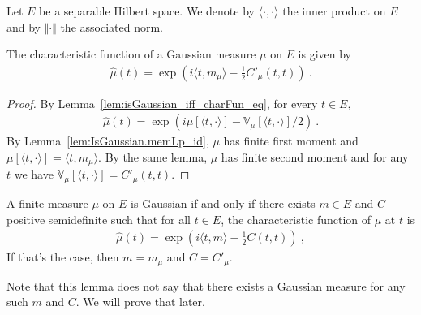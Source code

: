 Let $E$ be a separable Hilbert space. We denote by $\langle \cdot, \cdot \rangle$ the inner product on $E$ and by $\Vert \cdot \Vert$ the associated norm.

\begin{lemma}\label{lem:IsGaussian.charFun_eq}
The characteristic function of a Gaussian measure $\mu$ on $E$ is given by
\begin{align*}
  \hat{\mu}(t) = \exp\left(i \langle t, m_\mu \rangle - \frac{1}{2} C'_\mu(t, t)\right) \: .
\end{align*}
\end{lemma}

\begin{proof}  
By Lemma~\ref{lem:isGaussian_iff_charFun_eq}, for every $t \in E$,
\begin{align*}
  \hat{\mu}(t) = \exp\left(i \mu[\langle t, \cdot \rangle] - \mathbb{V}_\mu[\langle t, \cdot \rangle] / 2\right) \: .
\end{align*}
By Lemma~\ref{lem:IsGaussian.memLp_id}, $\mu$ has finite first moment and $\mu[\langle t, \cdot \rangle] = \langle t, m_\mu \rangle$. By the same lemma, $\mu$ has finite second moment and for any $t$ we have $\mathbb{V}_\mu[\langle t, \cdot\rangle] = C'_\mu(t, t)$.
\end{proof}

\begin{lemma}\label{lem:isGaussian_iff_gaussian_charFun}
A finite measure $\mu$ on $E$ is Gaussian if and only if there exists $m \in E$ and $C$ positive semidefinite such that for all $t \in E$, the characteristic function of $\mu$ at $t$ is
\begin{align*}
  \hat{\mu}(t) = \exp\left(i \langle t, m \rangle - \frac{1}{2} C(t, t)\right) \: ,
\end{align*}
If that's the case, then $m = m_\mu$ and $C = C'_\mu$.
\end{lemma}

Note that this lemma does not say that there exists a Gaussian measure for any such $m$ and $C$.
We will prove that later.

